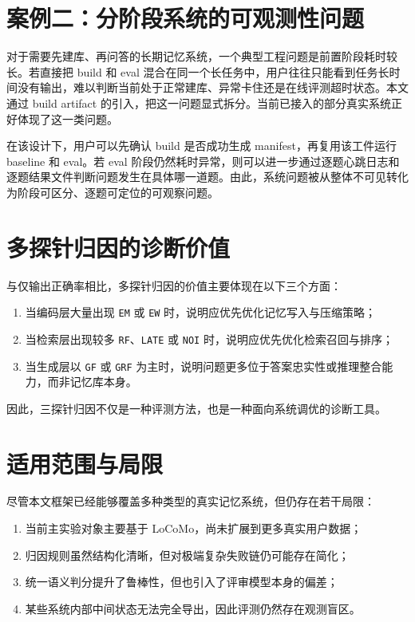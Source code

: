 \section{案例二：分阶段系统的可观测性问题}

对于需要先建库、再问答的长期记忆系统，一个典型工程问题是前置阶段耗时较长。若直接把 build 和 eval 混合在同一个长任务中，用户往往只能看到任务长时间没有输出，难以判断当前处于正常建库、异常卡住还是在线评测超时状态。本文通过 build artifact 的引入，把这一问题显式拆分。当前已接入的部分真实系统正好体现了这一类问题。

在该设计下，用户可以先确认 build 是否成功生成 manifest，再复用该工件运行 baseline 和 eval。若 eval 阶段仍然耗时异常，则可以进一步通过逐题心跳日志和逐题结果文件判断问题发生在具体哪一道题。由此，系统问题被从整体不可见转化为阶段可区分、逐题可定位的可观察问题。

\section{多探针归因的诊断价值}

与仅输出正确率相比，多探针归因的价值主要体现在以下三个方面：

\begin{enumerate}
    \item 当编码层大量出现 \texttt{EM} 或 \texttt{EW} 时，说明应优先优化记忆写入与压缩策略；
    \item 当检索层出现较多 \texttt{RF}、\texttt{LATE} 或 \texttt{NOI} 时，说明应优先优化检索召回与排序；
    \item 当生成层以 \texttt{GF} 或 \texttt{GRF} 为主时，说明问题更多位于答案忠实性或推理整合能力，而非记忆库本身。
\end{enumerate}

因此，三探针归因不仅是一种评测方法，也是一种面向系统调优的诊断工具。

\section{适用范围与局限}

尽管本文框架已经能够覆盖多种类型的真实记忆系统，但仍存在若干局限：

\begin{enumerate}
    \item 当前主实验对象主要基于 LoCoMo，尚未扩展到更多真实用户数据；
    \item 归因规则虽然结构化清晰，但对极端复杂失败链仍可能存在简化；
    \item 统一语义判分提升了鲁棒性，但也引入了评审模型本身的偏差；
    \item 某些系统内部中间状态无法完全导出，因此评测仍然存在观测盲区。
\end{enumerate}

